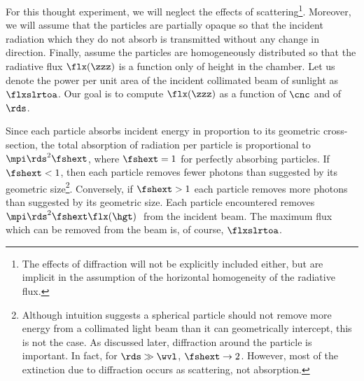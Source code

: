 \documentclass[12pt]{article}
\begin{document}
For this thought experiment, we will neglect the effects of
scattering\footnote{The effects of diffraction will not be explicitly
included either, but are implicit in the assumption of the horizontal
homogeneity of the radiative flux.}.
Moreover, we will assume that the particles are partially opaque so
that the incident radiation which they do not absorb is transmitted
without any change in direction.
Finally, assume the particles are homogeneously distributed so that 
the radiative flux $\flx(\zzz)$ is a function only of height in the chamber.
Let us denote the power per unit area of the incident collimated beam
of sunlight as $\flxslrtoa$.
Our goal is to compute $\flx(\zzz)$ as a function of $\cnc$ and of
$\rds$. 

Since each particle absorbs incident energy in proportion to its
geometric cross-section, the total absorption of radiation per
particle is proportional to $\mpi \rds^{2} \fshext$, where $\fshext = 1$
for perfectly absorbing particles.
If $\fshext < 1$, then each particle removes fewer photons than
suggested by its geometric size\footnote{Although intuition suggests a
spherical particle should not remove more energy from a collimated
light beam than it can geometrically intercept, this is not the case. 
As discussed later, diffraction around the particle is important. 
In fact, for $\rds \gg \wvl$, $\fshext \rightarrow 2$. 
However, most of the extinction due to diffraction occurs as
scattering, not absorption.}. 
Conversely, if $\fshext > 1$ each particle removes more photons than 
suggested by its geometric size.
Each particle encountered removes $\mpi \rds^{2} \fshext
\flx(\hgt)$\,\wxmS\ from the incident beam. 
The maximum flux which can be removed from the beam is, of course, 
$\flxslrtoa$. 
\end{document}

